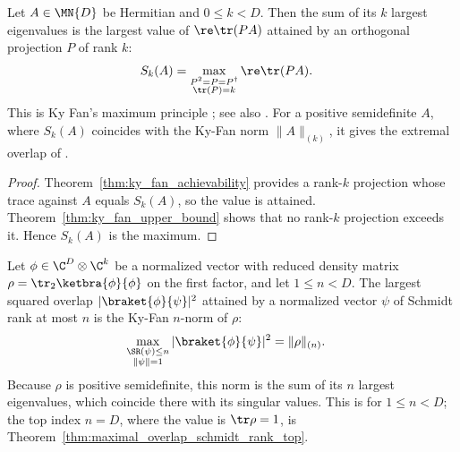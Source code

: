 \begin{theorem}
    \label{thm:ky_fan_maximum_principle}
    \leanok
    Let $A\in\MN{D}$ be Hermitian and $0\le k<D$. Then the sum of its $k$
    largest eigenvalues is the largest value of $\re\tr(PA)$ attained by an
    orthogonal projection $P$ of rank $k$:
    \begin{align}
        S_k(A)
         & =\max_{\substack{P^2=P=P^\dagger\\ \tr(P)=k}}\re\tr(PA).
        \label{eq:channel_ky_fan_maximum}
    \end{align}
    This is Ky Fan's maximum principle \cite{Fan1949Theorem}; see also
    \cite[Problem~I.6.15, Exercise~II.1.13]{Bhatia1997Matrix}. For a positive
    semidefinite $A$, where $S_k(A)$ coincides with the Ky-Fan norm
    $\|A\|_{(k)}$, it gives the extremal overlap of
    \cite[Lemma~3.1]{Wolf2012Quantum}.
\end{theorem}

\begin{proof}\leanok
    Theorem~\ref{thm:ky_fan_achievability} provides a rank-$k$ projection
    whose trace against $A$ equals $S_k(A)$, so the value is attained.
    Theorem~\ref{thm:ky_fan_upper_bound} shows that no rank-$k$ projection
    exceeds it. Hence $S_k(A)$ is the maximum.
\end{proof}

\begin{theorem}
    \label{thm:maximal_overlap_schmidt_rank}
    \leanok
    Let $\phi\in\C^{D}\otimes\C^k$ be a normalized vector with reduced density
    matrix $\rho=\tr_2\ketbra{\phi}{\phi}$ on the first factor, and let
    $1\le n<D$. The largest squared overlap $|\braket{\phi}{\psi}|^2$ attained
    by a normalized vector $\psi$ of Schmidt rank at most $n$ is the Ky-Fan
    $n$-norm of $\rho$:
    \begin{align}
        \max_{\substack{\SR(\psi)\le n\\ \|\psi\|=1}}
        |\braket{\phi}{\psi}|^2
         & =\|\rho\|_{(n)}.
        \label{eq:schwarz_maximal_schmidt_overlap}
    \end{align}
    Because $\rho$ is positive semidefinite, this norm is the sum of its $n$
    largest eigenvalues, which coincide there with its singular values. This is
    \cite[Lemma~3.1]{Wolf2012Quantum} for $1\le n<D$; the top index $n=D$,
    where the value is $\tr\rho=1$, is
    Theorem~\ref{thm:maximal_overlap_schmidt_rank_top}.
\end{theorem}

